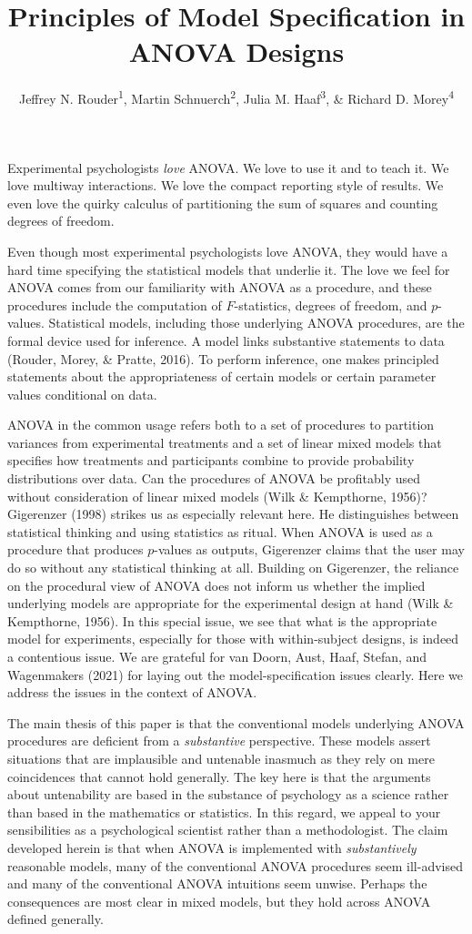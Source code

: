 \documentclass[
  english,
  ,man]{apa6}
\title{Principles of Model Specification in ANOVA Designs}
\author{Jeffrey N. Rouder\textsuperscript{1}, Martin Schnuerch\textsuperscript{2}, Julia M. Haaf\textsuperscript{3}, \& Richard D. Morey\textsuperscript{4}}
\date{}
\affiliation{\vspace{0.5cm}\textsuperscript{1} University of California, Irvine\\\textsuperscript{2} University of Mannheim\\\textsuperscript{3} University of Amsterdam\\\textsuperscript{4} University of Cardiff}
\begin{document}
\maketitle

Experimental psychologists \emph{love} ANOVA. We love to use it and to teach it. We love multiway interactions. We love the compact reporting style of results. We even love the quirky calculus of partitioning the sum of squares and counting degrees of freedom.

Even though most experimental psychologists love ANOVA, they would have a hard time specifying the statistical models that underlie it. The love we feel for ANOVA comes from our familiarity with ANOVA as a procedure, and these procedures include the computation of \(F\)-statistics, degrees of freedom, and \(p\)-values. Statistical models, including those underlying ANOVA procedures, are the formal device used for inference. A model links substantive statements to data (Rouder, Morey, \& Pratte, 2016). To perform inference, one makes principled statements about the appropriateness of certain models or certain parameter values conditional on data.

ANOVA in the common usage refers both to a set of procedures to partition variances from experimental treatments and a set of linear mixed models that specifies how treatments and participants combine to provide probability distributions over data. Can the procedures of ANOVA be profitably used without consideration of linear mixed models (Wilk \& Kempthorne, 1956)? Gigerenzer (1998) strikes us as especially relevant here. He distinguishes between statistical thinking and using statistics as ritual. When ANOVA is used as a procedure that produces \(p\)-values as outputs, Gigerenzer claims that the user may do so without any statistical thinking at all. Building on Gigerenzer, the reliance on the procedural view of ANOVA does not inform us whether the implied underlying models are appropriate for the experimental design at hand (Wilk \& Kempthorne, 1956). In this special issue, we see that what is the appropriate model for experiments, especially for those with within-subject designs, is indeed a contentious issue. We are grateful for van Doorn, Aust, Haaf, Stefan, and Wagenmakers (2021) for laying out the model-specification issues clearly. Here we address the issues in the context of ANOVA.

The main thesis of this paper is that the conventional models underlying ANOVA procedures are deficient from a \emph{substantive} perspective. These models assert situations that are implausible and untenable inasmuch as they rely on mere coincidences that cannot hold generally. The key here is that the arguments about untenability are based in the substance of psychology as a science rather than based in the mathematics or statistics. In this regard, we appeal to your sensibilities as a psychological scientist rather than a methodologist. The claim developed herein is that when ANOVA is implemented with \emph{substantively} reasonable models, many of the conventional ANOVA procedures seem ill-advised and many of the conventional ANOVA intuitions seem unwise. Perhaps the consequences are most clear in mixed models, but they hold across ANOVA defined generally.
\end{document}
